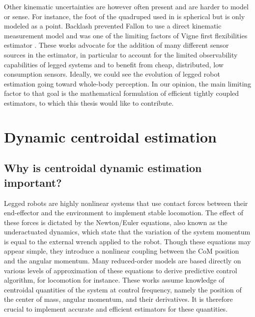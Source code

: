 Other kinematic uncertainties are however often present and are harder to model or sense. For instance, the foot of the quadruped used in 
\cite{bloesch2013state} is spherical but is only modeled as a point. Backlash prevented Fallon \cite{fallon2014drift} to use a direct kinematic 
measurement model and was one of the limiting factors of Vigne first flexibilities estimator \cite{vigne2018estimation}. 
These works advocate for the addition of many different sensor sources in the estimator, in particular to account for the limited observability
capabilities of legged systems and to benefit from cheap, distributed, low consumption sensors. Ideally, we could see the evolution of legged
robot estimation going toward whole-body perception. In our opinion, the main limiting factor to that goal is the mathematical formulation of efficient tightly
coupled estimators, to which this thesis would like to contribute.  


\section{Dynamic centroidal estimation}
%
\subsection{Why is centroidal dynamic estimation important?}
Legged robots are highly nonlinear systems that use contact forces between their end-effector and the environment to implement stable locomotion. 
The effect of these forces is dictated by the Newton/Euler equations, also known as the underactuated dynamics, which state that the variation of the 
system momentum is equal to the external wrench applied to the robot. Though these equations may appear simple, they introduce a nonlinear coupling 
between the CoM position and the angular momentum. Many reduced-order models are based directly on 
various levels of approximation of these equations \cite{kajita20013d, wieber2006trajectory, carpentier2016versatile} to derive predictive
control algorithm, for locomotion for instance. These works assume knowledge of centroidal quantities of the system at control frequency, 
namely the position of the center of mass, angular momentum, and their derivatives. 
It is therefore crucial to implement accurate and efficient estimators for these quantities.


